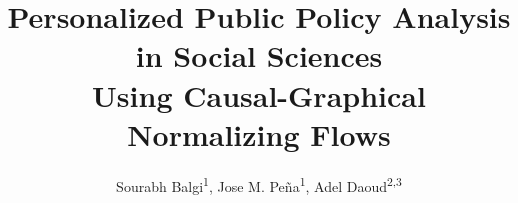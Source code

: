 \documentclass[letterpaper]{article} %
\title{Personalized Public Policy Analysis in Social Sciences\\Using Causal-Graphical Normalizing Flows}
\author {
    Sourabh Balgi\textsuperscript{\rm 1}, 
    Jose M. Pe{\~n}a\textsuperscript{\rm 1}, 
    Adel Daoud\textsuperscript{\rm 2,}\textsuperscript{\rm 3} \\
}
\begin{document}
\maketitle


\begin{abstract}


\end{abstract}
\end{document}
